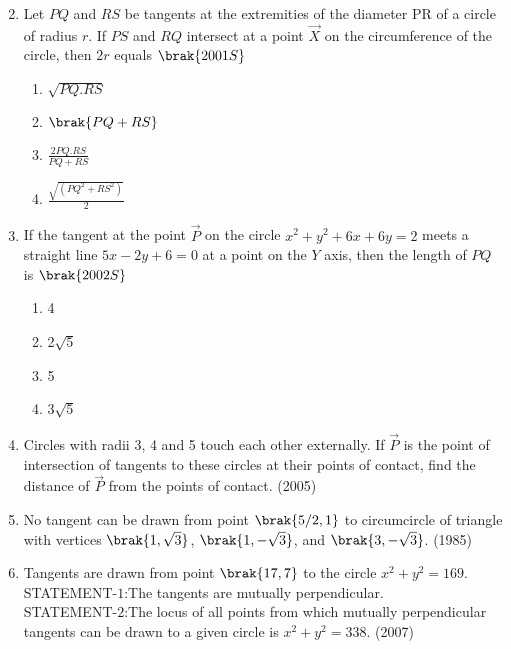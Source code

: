 \begin{enumerate}[label=\thesubsection.\arabic*.,ref=\thesubsection.\theenumi]
\begin{multicols}{2}
\end{multicols}
        \item Let $PQ$ and $RS$ be tangents at the extremities of the diameter PR of a circle of radius $r$. If $PS$ and $RQ$ intersect at a point $\vec{X}$ on the circumference of the circle,  then $2r$ equals
        \hfill$\brak{2001S}$
\begin{multicols}{4}
\begin{enumerate}
    \item $\sqrt{PQ.RS}$
     \item $\brak{PQ+RS}$
     \item $\frac{2PQ.RS}{PQ+RS}$
     \item $\frac{\sqrt{(PQ^2+RS^2)}}{2}$
     \end{enumerate}
\end{multicols}
     \item If the tangent at the point $\vec{P}$ on the circle $x^2+y^2+6x+6y=2$ meets a straight line $5x-2y+6=0$ at a point on the $Y$ axis,  then the length of $PQ$ is 
             \hfill$\brak{2002S}$
             \begin{multicols}{4}
\begin{enumerate}
             \item 4
             \item 2$\sqrt5$
             \item 5
             \item 3$\sqrt5$
\end{enumerate}
\end{multicols}
\item Circles with radii 3, 4 and 5 touch each other externally. If $\vec{P}$ is the point of intersection of tangents to these circles at their points of contact,  find the distance of $\vec{P}$ from the points of contact.
	           \hfill(2005) 
    \item No tangent can be drawn from point $\brak{5/2,  1}$ to circumcircle of triangle with vertices $\brak{1,  \sqrt{3}}$,  $\brak{1,  -\sqrt{3}}$,  and $\brak{3,  -\sqrt{3}}$.
    \hfill{(1985)}
\item Tangents are drawn from point $\brak{17,  7}$ to the circle $x^2+y^2=169$.\\
STATEMENT-$1$:The tangents are mutually perpendicular.\\
STATEMENT-$2$:The locus of all points from which mutually perpendicular tangents can be drawn to a given circle is $x^2+y^2=338$. \hfill(2007)
\begin{enumerate}

\end{enumerate}
\end{enumerate}

